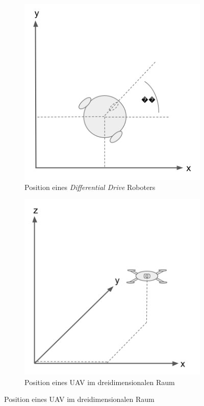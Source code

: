 \mbox{}
\begin{figure}
  \begin{subfigure}[t]{.3\textwidth}
    \centering
    \includegraphics[width=.8\linewidth]{pic/vorwissen/1a_diffdrive.png}
    \caption{Position eines \textit{Differential Drive} Roboters}
    \label{fig:1a_dd}
  \end{subfigure}\hfill
  \begin{subfigure}[t]{.3\textwidth}
    \centering
    \includegraphics[width=.8\linewidth]{pic/vorwissen/1b_uav.png}
    \caption{Position eines UAV im dreidimensionalen Raum}

\end{subfigure}
\end{figure}
